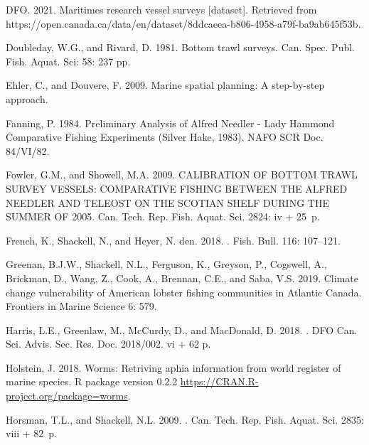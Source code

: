 \documentclass[12pt]{article}\usepackage[]{graphicx}\usepackage[]{color}
\begin{document}
\begin{CSLReferences}{1}{0}
\leavevmode\hypertarget{ref-OpenData_MAR_RV}{}%
DFO. 2021. Maritimes research vessel surveys {[}dataset{]}. Retrieved from https://open.canada.ca/data/en/dataset/8ddcaeea-b806-4958-a79f-ba9ab645f53b.

\leavevmode\hypertarget{ref-DoubledayRivard1981}{}%
Doubleday, W.G., and Rivard, D. 1981. Bottom trawl surveys. Can. Spec. Publ. Fish. Aquat. Sci: 58: 237 pp.

\leavevmode\hypertarget{ref-Ehler:2009}{}%
Ehler, C., and Douvere, F. 2009. Marine spatial planning: A step-by-step approach.

\leavevmode\hypertarget{ref-Fanning-1984}{}%
Fanning, P. 1984. Preliminary {A}nalysis of {A}lfred {N}eedler - {L}ady {H}ammond {C}omparative {F}ishing {E}xperiments ({S}ilver {H}ake, 1983). NAFO SCR Doc. 84/VI/82.

\leavevmode\hypertarget{ref-Fowler-Showell-2009}{}%
Fowler, G.M., and Showell, M.A. 2009. CALIBRATION OF BOTTOM TRAWL SURVEY VESSELS: COMPARATIVE FISHING BETWEEN THE {A}LFRED {N}EEDLER AND TELEOST ON THE {S}COTIAN {S}HELF DURING THE SUMMER OF 2005. Can. Tech. Rep. Fish. Aquat. Sci. 2824: iv + 25~p.

\leavevmode\hypertarget{ref-French:2018}{}%
French, K., Shackell, N., and Heyer, N. den. 2018. . Fish. Bull. 116: 107--121.

\leavevmode\hypertarget{ref-Greenan:2019}{}%
Greenan, B.J.W., Shackell, N.L., Ferguson, K., Greyson, P., Cogswell, A., Brickman, D., Wang, Z., Cook, A., Brennan, C.E., and Saba, V.S. 2019. Climate change vulnerability of {A}merican lobster fishing communities in {A}tlantic {C}anada. Frontiers in Marine Science 6: 579.

\leavevmode\hypertarget{ref-Harris:2018}{}%
Harris, L.E., Greenlaw, M., McCurdy, D., and MacDonald, D. 2018. . DFO Can. Sci. Advis. Sec. Res. Doc. 2018/002. vi + 62 p.

\leavevmode\hypertarget{ref-R:package:worms}{}%
Holstein, J. 2018. Worms: Retriving aphia information from world register of marine species. R package version 0.2.2 \url{https://CRAN.R-project.org/package=worms}.

\leavevmode\hypertarget{ref-Horsman:atlas:2009}{}%
Horsman, T.L., and Shackell, N.L. 2009. . Can. Tech. Rep. Fish. Aquat. Sci. 2835: viii + 82~p.


\end{CSLReferences}
\end{document}
